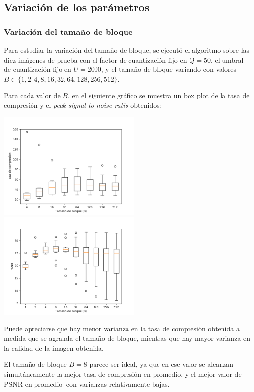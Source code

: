 \documentclass{article}
\newcommand{\set}[1]{\{#1\}}
\begin{document}
\subsection{Variación de los parámetros}

\subsubsection{Variación del tamaño de bloque}

Para estudiar la variación del tamaño de bloque, se ejecutó el
algoritmo sobre las diez imágenes de prueba con el
factor de cuantización fijo en $Q = 50$,
el umbral de cuantización fijo en $U = 2000$,
y el tamaño de bloque variando con valores
$B \in \set{1,2,4,8,16,32,64,128,256,512}$.

Para cada valor de $B$, en el siguiente gráfico se muestra un
box plot de la tasa de compresión y el
{\em peak signal-to-noise ratio} obtenidos:\\
\begin{center}
\includegraphics[width=7cm]{../imgs/output/gray_plots/b_rate.png}
\includegraphics[width=7cm]{../imgs/output/gray_plots/b_psnr.png}
\end{center}

Puede apreciarse que hay menor varianza en la tasa de compresión
obtenida a medida que se agranda el tamaño de bloque,
mientras que hay mayor varianza en la calidad de la imagen obtenida.

El tamaño de bloque $B = 8$ parece ser ideal, ya que en ese valor
se alcanzan simultáneamente la mejor tasa de compresión en promedio,
y el mejor valor de PSNR en promedio, con varianzas relativamente
bajas.
\end{document}
